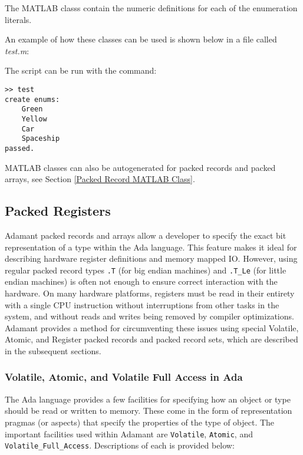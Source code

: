 The MATLAB classs contain the numeric definitions for each of the enumeration literals.

An example of how these classes can be used is shown below in a file called \textit{test.m}:


The script can be run with the command:

\vspace{5mm} %
\begin{verbatim}
>> test
create enums:
    Green
    Yellow
    Car
    Spaceship
passed.
\end{verbatim}
\vspace{5mm} %

MATLAB classes can also be autogenerated for packed records and packed arrays, see Section \ref{Packed Record MATLAB Class}.

\subsection{Packed Registers}

Adamant packed records and arrays allow a developer to specify the exact bit representation of a type within the Ada language. This feature makes it ideal for describing hardware register definitions and memory mapped IO. However, using regular packed record types \texttt{.T} (for big endian machines) and \texttt{.T\_Le} (for little endian machines) is often not enough to ensure correct interaction with the hardware. On many hardware platforms, registers must be read in their entirety with a single CPU instruction without interruptions from other tasks in the system, and without reads and writes being removed by compiler optimizations. Adamant provides a method for circumventing these issues using special Volatile, Atomic, and Register packed records and packed record sets, which are described in the subsequent sections.

\subsubsection{Volatile, Atomic, and Volatile Full Access in Ada}

The Ada language provides a few facilities for specifying how an object or type should be read or written to memory. These come in the form of representation pragmas (or aspects) that specify the properties of the type of object. The important facilities used within Adamant are \texttt{Volatile}, \texttt{Atomic}, and \texttt{Volatile\_Full\_Access}. Descriptions of each is provided below:

